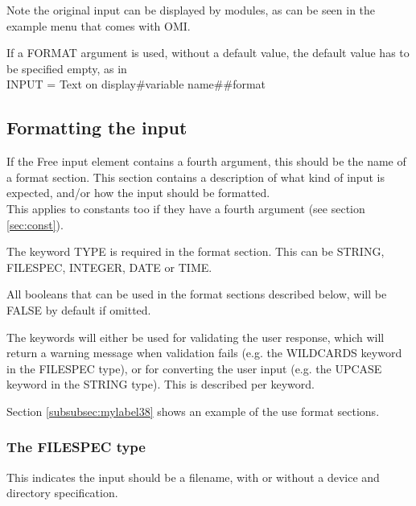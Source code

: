 \documentclass[a4paper]{book}
\newcommand{\vs}{\vspace{3mm}}
\renewcommand{\indent}{\hspace*{5mm}}
\begin{document}
Note the original input can be displayed by modules, as can be seen in the example menu that comes with OMI.

\vs

If a FORMAT argument is used, without a default value, the default value has 
to be specified empty, as in \\
\indent\textsf{INPUT = Text on display{\#}variable name{\#}{\#}format}

\subsection{Formatting the input}
\label{subsubsec:formatting}

If the Free input element contains a fourth argument, this should be the 
name of a format section. This section contains a description of what kind of
input is expected, and/or how the input should be formatted.\\
This applies to constants too if they have a fourth argument (see section \ref{sec:const}).

\vs

The keyword \textsf{TYPE} is required in the format section. This can be \textsf{STRING}, 
\textsf{FILESPEC}, \textsf{INTEGER}, \textsf{DATE} or \textsf{TIME}.

All booleans that can be used in the format sections described below, will 
be \textsf{FALSE} by default if omitted.

\vs

The keywords will either be used for validating the user response, which 
will return a warning message when validation fails (e.g. the \textsf{WILDCARDS} 
keyword in the \textsf{FILESPEC} type), 
or for converting the user input (e.g. the \textsf{UPCASE} keyword in the \textsf{STRING} 
type). This is described per 
keyword.

Section \ref{subsubsec:mylabel38} shows an example of the use format sections.

\subsubsection{The FILESPEC type}

This indicates the input should be a filename, with or without a device and 
directory specification.
\end{document}
